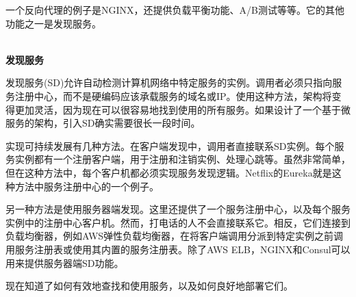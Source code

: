 一个反向代理的例子是NGINX，还提供负载平衡功能、A/B测试等等。它的其他功能之一是发现服务。

\hspace*{\fill} \\ %
\noindent
\textbf{发现服务}

发现服务(SD)允许自动检测计算机网络中特定服务的实例。调用者必须只指向服务注册中心，而不是硬编码应该承载服务的域名或IP。使用这种方法，架构将变得更加灵活，因为现在可以很容易地找到使用的所有服务。如果设计了一个基于微服务的架构，引入SD确实需要很长一段时间。

实现可持续发展有几种方法。在客户端发现中，调用者直接联系SD实例。每个服务实例都有一个注册客户端，用于注册和注销实例、处理心跳等。虽然非常简单，但在这种方法中，每个客户机都必须实现服务发现逻辑。Netflix的Eureka就是这种方法中服务注册中心的一个例子。

另一种方法是使用服务器端发现。这里还提供了一个服务注册中心，以及每个服务实例中的注册中心客户机。然而，打电话的人不会直接联系它。相反，它们连接到负载均衡器，例如AWS弹性负载均衡器，在将客户端调用分派到特定实例之前调用服务注册表或使用其内置的服务注册表。除了AWS ELB，NGINX和Consul可以用来提供服务器端SD功能。

现在知道了如何有效地查找和使用服务，以及如何良好地部署它们。






